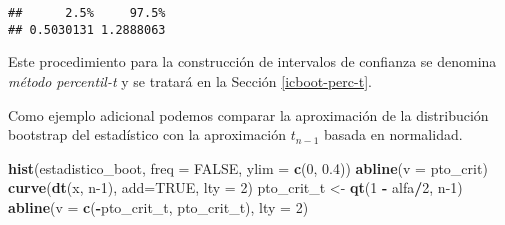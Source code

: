 \documentclass[
]{book}
\newenvironment{Shaded}{\begin{snugshade}}{\end{snugshade}}
\newcommand{\CommentTok}[1]{\textcolor[rgb]{0.56,0.35,0.01}{\textit{#1}}}
\newcommand{\DataTypeTok}[1]{\textcolor[rgb]{0.13,0.29,0.53}{#1}}
\newcommand{\DecValTok}[1]{\textcolor[rgb]{0.00,0.00,0.81}{#1}}
\newcommand{\FloatTok}[1]{\textcolor[rgb]{0.00,0.00,0.81}{#1}}
\newcommand{\KeywordTok}[1]{\textcolor[rgb]{0.13,0.29,0.53}{\textbf{#1}}}
\newcommand{\NormalTok}[1]{#1}
\newcommand{\OperatorTok}[1]{\textcolor[rgb]{0.81,0.36,0.00}{\textbf{#1}}}
\newcommand{\OtherTok}[1]{\textcolor[rgb]{0.56,0.35,0.01}{#1}}
\newcommand{\StringTok}[1]{\textcolor[rgb]{0.31,0.60,0.02}{#1}}
\theoremstyle{break}
\theoremstyle{definition}
\theoremstyle{definition}
\theoremstyle{definition}
\theoremstyle{remark}
\begin{document}
\begin{Shaded}
\end{Shaded}

\begin{verbatim}
##      2.5%     97.5% 
## 0.5030131 1.2888063
\end{verbatim}

Este procedimiento para la construcción de intervalos de confianza
se denomina \emph{método percentil-t} y se tratará en la Sección \ref{icboot-perc-t}.

Como ejemplo adicional podemos comparar la aproximación de la distribución bootstrap del estadístico con la aproximación \(t_{n-1}\) basada en normalidad.

\begin{Shaded}
\begin{Highlighting}[]
\KeywordTok{hist}\NormalTok{(estadistico_boot, }\DataTypeTok{freq =} \OtherTok{FALSE}\NormalTok{, }\DataTypeTok{ylim =} \KeywordTok{c}\NormalTok{(}\DecValTok{0}\NormalTok{, }\FloatTok{0.4}\NormalTok{))}
\KeywordTok{abline}\NormalTok{(}\DataTypeTok{v =}\NormalTok{ pto_crit)}
\KeywordTok{curve}\NormalTok{(}\KeywordTok{dt}\NormalTok{(x, n}\DecValTok{-1}\NormalTok{), }\DataTypeTok{add=}\OtherTok{TRUE}\NormalTok{, }\DataTypeTok{lty =} \DecValTok{2}\NormalTok{)}
\NormalTok{pto_crit_t <-}\StringTok{ }\KeywordTok{qt}\NormalTok{(}\DecValTok{1} \OperatorTok{-}\StringTok{ }\NormalTok{alfa}\OperatorTok{/}\DecValTok{2}\NormalTok{, n}\DecValTok{-1}\NormalTok{)}
\KeywordTok{abline}\NormalTok{(}\DataTypeTok{v =} \KeywordTok{c}\NormalTok{(}\OperatorTok{-}\NormalTok{pto_crit_t, pto_crit_t), }\DataTypeTok{lty =} \DecValTok{2}\NormalTok{)}
\end{Highlighting}
\end{Shaded}
\end{document}
